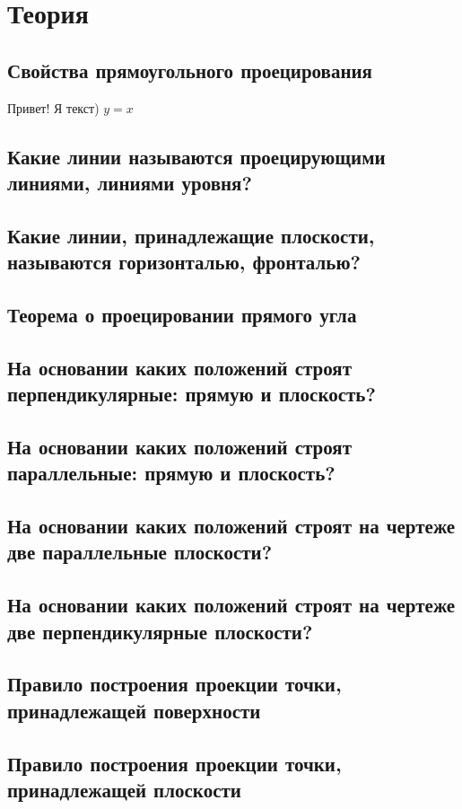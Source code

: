 \documentclass[a4paper, 10pt]{article}
\begin{document}
\section{Теория}
\subsection{Свойства прямоугольного проецирования}

Привет! Я текст)
$y = x$

\subsection{Какие линии называются проецирующими линиями, линиями уровня?}
\subsection{Какие линии, принадлежащие плоскости, называются горизонталью, фронталью?}
\subsection{Теорема о проецировании прямого угла}
\subsection{На основании каких положений строят перпендикулярные: прямую и плоскость?}
\subsection{На основании каких положений строят параллельные: прямую и плоскость?}
\subsection{На основании каких положений строят на чертеже две параллельные плоскости?}
\subsection{На основании каких положений строят на чертеже две перпендикулярные плоскости?}
\subsection{Правило построения проекции точки, принадлежащей поверхности}
\subsection{Правило построения проекции точки, принадлежащей плоскости}
\end{document}
